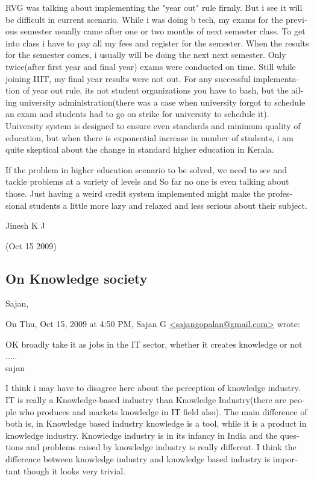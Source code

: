 \begin{english}
RVG was talking about implementing the "year out" rule firmly. But i see it will be difficult in current scenario. While i was doing b tech, my exams for the previous semester usually came after one or two months of next semester class. To get into class i have to pay all my fees and register for the semester. When the results for the semester comes, i usually will be doing the next next semester. Only twice(after first year and final year) exams were conducted on time. Still while joining IIIT, my final year results were not out. For any successful implementation of year out rule, its not student organizations you have to bash, but the ailing university administration(there was a case when university forgot to schedule an exam and students had to go on strike for university to schedule it). University system is designed to ensure even standards and minimum quality of education, but when there is exponential increase in number of students, i am quite skeptical about the change in standard higher education in Kerala.

If the problem in higher education scenario to be solved, we need to see and tackle problems at a variety of levels and So far no one is even talking about those. Just having a weird credit system implemented might make the professional students a little more lazy and relaxed and less serious about their subject.

Jinesh K J

\begin{flushright}(Oct 15 2009)\end{flushright}


\subsection*{On Knowledge society}
Sajan,

On Thu, Oct 15, 2009 at 4:50 PM, Sajan G \url{<sajangopalan@gmail.com>} wrote:

    OK broadly take it as jobs in the IT sector, whether it creates knowledge or not .....\\
    sajan

I think i may have to disagree here about the perception of knowledge industry. IT is really a Knowledge-based industry than Knowledge Industry(there are people who produces and markets knowledge in IT field also). The main difference of both is, in Knowledge based industry knowledge is a tool, while it is a product in knowledge industry. Knowledge industry is in its infancy in India and the questions and problems raised by knowledge industry is really different. I think the difference between knowledge industry and knowledge based industry is important though it looks very trivial.


\end{english}
